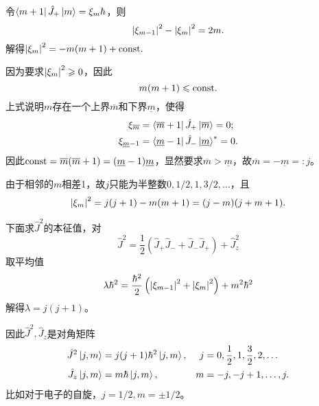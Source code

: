 令$\left\langle m+1\right\vert\hat J_+\left\vert m\right\rangle=\xi_m\hbar$，则 
\[
	\left\lvert\xi_{m-1}\right\rvert^2-\left\lvert\xi_m\right\rvert^2=2m.
\]
解得$\left\lvert\xi_m\right\rvert^2=-m(m+1)+\text{const}.$

因为要求$\left\lvert\xi_m\right\rvert^2\geqslant 0$，因此 
\[
m(m+1)\leqslant\text{const}.
\]
上式说明$m$存在一个上界$\overline m$和下界$\underline m$，使得
\begin{align*}
	\xi_{\overline m}&=\left\langle \overline m+1\right\vert\hat J_+\left\vert \overline m\right\rangle=0;\\
	\xi_{\underline m-1}&=\left\langle \underline m-1\right\vert\hat J_-\left\vert \underline m\right\rangle^\ast=0.
\end{align*}
因此$\text{const}=\overline m(\overline m+1)=(\underline m-1)\underline m$，显然要求$\overline m>\underline m$，故$\overline m=-\underline m=:j$。

由于相邻的$m$相差1，故$j$只能为半整数$0, 1/2, 1, 3/2, \ldots$，且
\[
	\left\lvert\xi_m\right\rvert^2=j(j+1)-m(m+1)=(j-m)(j+m+1).
\]

下面求$\hat J^2$的本征值，对
\[
	\hat J^2=\frac12(\hat J_+\hat J_-+\hat J_-\hat J_+)+\hat J_z^2
\]
取平均值
\[
	\lambda\hbar^2=\frac{\hbar^2}2\left(\left\lvert\xi_{m-1}\right\rvert^2+\left\lvert\xi_m\right\rvert^2\right)+m^2\hbar^2
\]
解得$\lambda=j(j+1)$。

因此$\hat J^2,\hat J_z$是对角矩阵
\begin{align}
	\hat J^2\left\vert j,m\right\rangle&=j(j+1)\hbar^2\left\vert j,m\right\rangle,&j&=0,\frac12,1,\frac32,2,\ldots\\
	\hat J_z\left\vert j,m\right\rangle&=m\hbar\left\vert j,m\right\rangle,&m&=-j,-j+1,\ldots,j.
\end{align}
比如对于电子的自旋，$j=1/2,m=\pm 1/2$。

